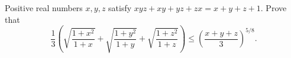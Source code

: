 Positive real numbers $x, y, z$ satisfy $xyz+xy+yz+zx = x+y+z+1$. Prove that \[ \frac{1}{3} \left( \sqrt{\frac{1+x^2}{1+x}} + \sqrt{\frac{1+y^2}{1+y}} + \sqrt{\frac{1+z^2}{1+z}} \right) \le \left( \frac{x+y+z}{3} \right)^{5/8} . \]